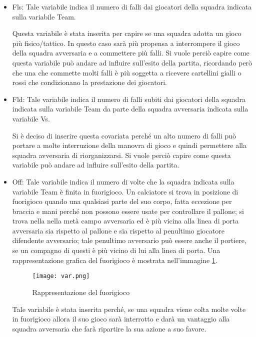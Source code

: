 \begin{itemize}
	\item \textsf{Fls}: Tale variabile indica il numero di falli dai giocatori della squadra indicata sulla variabile \textsf{Team}. 
	
	Questa variabile è stata inserita per capire se una squadra adotta un gioco più fisico/tattico. In questo caso sarà più propensa a interrompere il gioco della squadra avversaria e a commettere più falli. Si vuole perciò capire come questa variabile può andare ad influire sull'esito della partita, ricordando però che una che commette molti falli è più soggetta a ricevere cartellini gialli o rossi che condizionano la prestazione dei giocatori.
	\item \textsf{Fld}: Tale variabile indica il numero di falli subiti dai giocatori della squadra indicata sulla variabile \textsf{Team} da parte della squadra avversaria indicata sulla variabile \textsf{Vs}. 
	
	Si è deciso di inserire questa covariata perché un alto numero di falli può portare a molte interruzione della manovra di gioco e quindi permettere alla squadra avversaria di riorganizzarsi. Si vuole perciò capire come questa variabile può andare ad influire sull'esito della partita.
	\item \textsf{Off}: Tale variabile indica il numero di volte che la squadra indicata sulla variabile \textsf{Team} è finita in fuorigioco. Un calciatore si trova in posizione di fuorigioco quando una qualsiasi parte del suo corpo, fatta eccezione per braccia e mani perché non possono essere usate per controllare il pallone; si trova nella nella metà campo avversaria ed è più vicina alla linea di porta avversaria sia rispetto al pallone e sia rispetto al penultimo giocatore difendente avversario; tale penultimo avversario può essere anche il portiere, se un compagno di questi è più vicino di lui alla linea di porta. Una rappresentazione grafica del fuorigioco è mostrata nell'immagine \ref{fig:offside}.
	
	\begin{figure}[!ht]
		\begin{center}
			\texttt{[image: var.png]}
			
			\caption{Rappresentazione del fuorigioco} \label{fig:offside}
		\end{center}
	\end{figure}
	
	Tale variabile è stata inserita perché, se una squadra viene colta molte volte in fuorigioco allora il suo gioco sarà interrotto e darà un vantaggio alla squadra avversaria che farà ripartire la sua azione a suo favore.
	
\end{itemize}
\pagebreak
